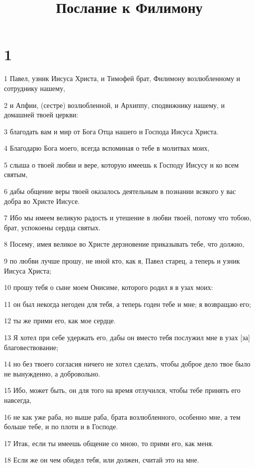 

\title{Послание к Филимону}


\chapter{1}

\par 1 Павел, узник Иисуса Христа, и Тимофей брат, Филимону возлюбленному и сотруднику нашему,
\par 2 и Апфии, (сестре) возлюбленной, и Архиппу, сподвижнику нашему, и домашней твоей церкви:
\par 3 благодать вам и мир от Бога Отца нашего и Господа Иисуса Христа.
\par 4 Благодарю Бога моего, всегда вспоминая о тебе в молитвах моих,
\par 5 слыша о твоей любви и вере, которую имеешь к Господу Иисусу и ко всем святым,
\par 6 дабы общение веры твоей оказалось деятельным в познании всякого у вас добра во Христе Иисусе.
\par 7 Ибо мы имеем великую радость и утешение в любви твоей, потому что тобою, брат, успокоены сердца святых.
\par 8 Посему, имея великое во Христе дерзновение приказывать тебе, что должно,
\par 9 по любви лучше прошу, не иной кто, как я, Павел старец, а теперь и узник Иисуса Христа;
\par 10 прошу тебя о сыне моем Онисиме, которого родил я в узах моих:
\par 11 он был некогда негоден для тебя, а теперь годен тебе и мне; я возвращаю его;
\par 12 ты же прими его, как мое сердце.
\par 13 Я хотел при себе удержать его, дабы он вместо тебя послужил мне в узах [за] благовествование;
\par 14 но без твоего согласия ничего не хотел сделать, чтобы доброе дело твое было не вынужденно, а добровольно.
\par 15 Ибо, может быть, он для того на время отлучился, чтобы тебе принять его навсегда,
\par 16 не как уже раба, но выше раба, брата возлюбленного, особенно мне, а тем больше тебе, и по плоти и в Господе.
\par 17 Итак, если ты имеешь общение со мною, то прими его, как меня.
\par 18 Если же он чем обидел тебя, или должен, считай это на мне.
